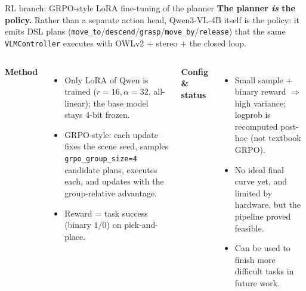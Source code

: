 \documentclass[aspectratio=169,10pt]{beamer}
\begin{document}
\begin{frame}{RL branch: GRPO-style LoRA fine-tuning of the planner}
\textbf{The planner \emph{is} the policy.} Rather than a separate action head, Qwen3-VL-4B itself is the policy: it emits DSL plans (\texttt{move\_to}/\texttt{descend}/\texttt{grasp}/\texttt{move\_by}/\texttt{release}) that the same \texttt{VLMController} executes with OWLv2 + stereo + the closed loop.
\vspace{4pt}

\begin{columns}[T,onlytextwidth]
\textbf{Method}
\begin{itemize}
    \item \alert{Only LoRA} of Qwen is trained ($r{=}16,\alpha{=}32$, all-linear); the base model stays 4-bit frozen.
    \item \alert{GRPO-style}: each update fixes the scene seed, samples \texttt{grpo\_group\_size=4} candidate plans, executes each, and updates with the group-relative advantage.
    \item \alert{Reward = task success} (binary $1/0$) on pick-and-place.
\end{itemize}
\textbf{Config \& status}
\begin{itemize}
    \item Small sample $+$ binary reward $\Rightarrow$ high variance; logprob is recomputed post-hoc (not textbook GRPO).
    \item No ideal final curve yet, and limited by hardware, but the pipeline proved feasible.
    \item Can be used to finish more difficult tasks in future work.
\end{itemize}
\end{columns}
\end{frame}
\end{document}
